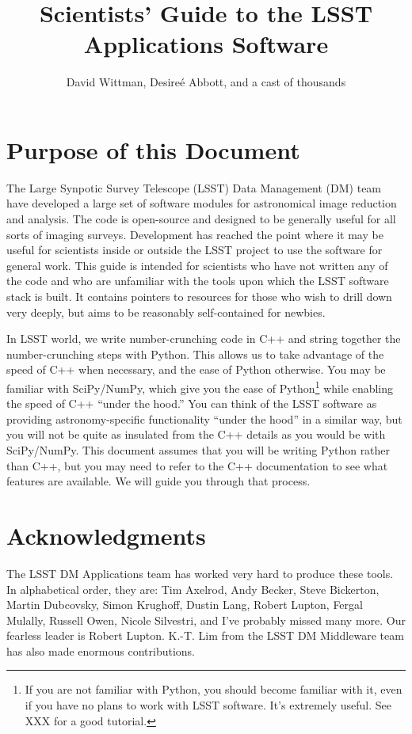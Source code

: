\documentclass{book}
\title{Scientists' Guide to the LSST Applications Software}
\author{David Wittman, Desire\'{e} Abbott, and a cast of thousands}
\begin{document}
\maketitle

\chapter*{Purpose of this Document}

The Large Synpotic Survey Telescope (LSST) Data Management (DM) team
have developed a large set of software modules for astronomical image
reduction and analysis.  The code is open-source and designed to be
generally useful for all sorts of imaging surveys.  Development has
reached the point where it may be useful for scientists inside or
outside the LSST project to use the software for general work.  This
guide is intended for scientists who have not written any of the code
and who are unfamiliar with the tools upon which the LSST software
stack is built.  It contains pointers to resources for those who wish
to drill down very deeply, but aims to be reasonably self-contained
for newbies.

In LSST world, we write number-crunching code in C++ and string
together the number-crunching steps with Python.  This allows us to
take advantage of the speed of C++ when necessary, and the ease of
Python otherwise.  You may be familiar with SciPy/NumPy, which give
you the ease of Python\footnote{If you are not familiar with Python,
  you should become familiar with it, even if you have no plans to
  work with LSST software.  It's extremely useful.  See XXX for a good
  tutorial.} while enabling the speed of C++ ``under the hood.''  You
can think of the LSST software as providing astronomy-specific
functionality ``under the hood'' in a similar way, but you will not be
quite as insulated from the C++ details as you would be with
SciPy/NumPy.  This document assumes that you will be writing Python
rather than C++, but you may need to refer to the C++ documentation to
see what features are available.  We will guide you through that
process.

\chapter*{Acknowledgments}

The LSST DM Applications team has worked very hard to produce these
tools.  In alphabetical order, they are: Tim Axelrod, Andy Becker,
Steve Bickerton, Martin Dubcovsky, Simon Krughoff, Dustin Lang, Robert
Lupton, Fergal Mulally, Russell Owen, Nicole Silvestri, and I've
probably missed many more.  Our fearless leader is Robert Lupton.
K.-T. Lim from the LSST DM Middleware team has also made enormous
contributions.
\end{document}
